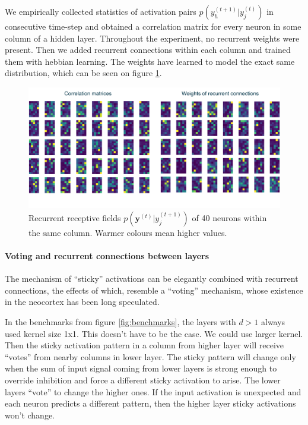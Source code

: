 \documentclass[12pt]{article}
\begin{document}
We empirically collected statistics of activation pairs $p(y_h^{(t+1)}|y_j^{(t)})$ in consecutive time-step and obtained a correlation matrix for every neuron in some column of a hidden layer. Throughout the experiment, no recurrent weights were present. Then we added recurrent connections within each column and trained them with hebbian learning. The weights have learned to model the exact same distribution, which can be seen on figure \ref{fig:recurrent_connections}.

\begin{figure}[!htbp]
	\centering
	\includegraphics[width=13.8cm]{recurrent_connections}
	\caption{Recurrent receptive fields $p(\boldsymbol{y}^{(t)}|y_j^{(t+1)})$ of 40 neurons within the same column. Warmer colours mean higher values.}
	\label{fig:recurrent_connections}
\end{figure} 
 
 \paragraph{Voting and recurrent connections between layers}
 
 The mechanism of ``sticky'' activations can be elegantly combined with recurrent connections, the effects of which, resemble a ``voting'' mechanism, whose existence in the neocortex has been long speculated.
 
In the benchmarks from figure \ref{fig:benchmarks}, the layers with $d>1$ always used kernel size 1x1. This doesn't have to be the case. We could use larger kernel.  Then the sticky activation pattern in a column from higher layer will receive ``votes'' from nearby columns in lower layer. The sticky pattern will change only when the sum of input signal coming from lower layers is strong enough to override inhibition and force a different sticky activation to arise. The lower layers ``vote'' to change the higher ones. If the input activation is unexpected and each neuron predicts a different pattern, then the higher layer sticky activations won't change. 
\end{document}
